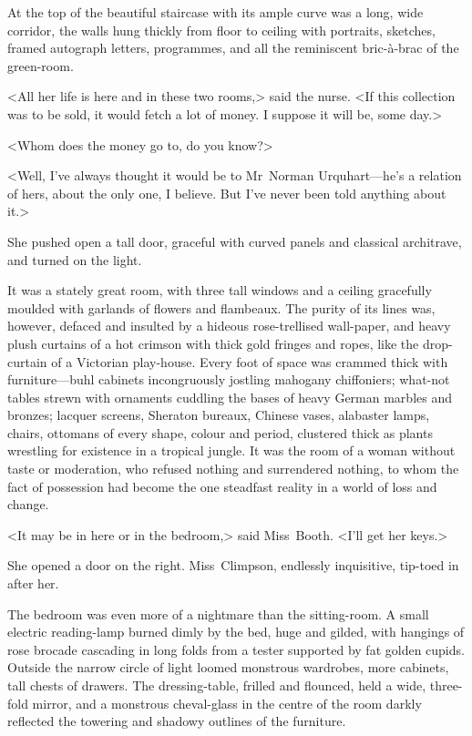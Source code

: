 At the top of the beautiful staircase with its ample curve was a long, wide corridor, the walls hung thickly from floor to ceiling with portraits, sketches, framed autograph letters, programmes, and all the reminiscent bric-à-brac of the green-room.

<All her life is here and in these two rooms,> said the nurse. <If this collection was to be sold, it would fetch a lot of money. I suppose it will be, some day.>

<Whom does the money go to, do you know?>

<Well, I've always thought it would be to Mr~Norman Urquhart—he's a relation of hers, about the only one, I believe. But I've never been told anything about it.>

She pushed open a tall door, graceful with curved panels and classical architrave, and turned on the light.

It was a stately great room, with three tall windows and a ceiling gracefully moulded with garlands of flowers and flambeaux. The purity of its lines was, however, defaced and insulted by a hideous rose-trellised wall-paper, and heavy plush curtains of a hot crimson with thick gold fringes and ropes, like the drop-curtain of a Victorian play-house. Every foot of space was crammed thick with furniture—buhl cabinets incongruously jostling mahogany chiffoniers; what-not tables strewn with ornaments cuddling the bases of heavy German marbles and bronzes; lacquer screens, Sheraton bureaux, Chinese vases, alabaster lamps, chairs, ottomans of every shape, colour and period, clustered thick as plants wrestling for existence in a tropical jungle. It was the room of a woman without taste or moderation, who refused nothing and surrendered nothing, to whom the fact of possession had become the one steadfast reality in a world of loss and change.

<It may be in here or in the bedroom,> said Miss~Booth. <I'll get her keys.>

She opened a door on the right. Miss~Climpson, endlessly inquisitive, tip-toed in after her.

The bedroom was even more of a nightmare than the sitting-room. A small electric reading-lamp burned dimly by the bed, huge and gilded, with hangings of rose brocade cascading in long folds from a tester supported by fat golden cupids. Outside the narrow circle of light loomed monstrous wardrobes, more cabinets, tall chests of drawers. The dressing-table, frilled and flounced, held a wide, three-fold mirror, and a monstrous cheval-glass in the centre of the room darkly reflected the towering and shadowy outlines of the furniture.

